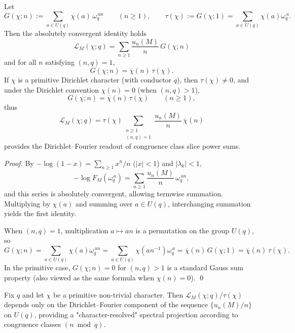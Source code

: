 \begin{theorem}\label{thm:finite-part-dirichlet-torsion-gauss-expansion}
Let
\[
G(\chi;n):=\sum_{a\in U(q)}\chi(a)\,\omega_q^{\,an}\qquad(n\ge1),
\qquad
\tau(\chi):=G(\chi;1)=\sum_{a\in U(q)}\chi(a)\omega_q^{\,a}.
\]
Then the absolutely convergent identity holds
\[
\boxed{\;
\mathcal{L}_M(\chi;q)=\sum_{n\ge1}\frac{u_n(M)}{n}\,G(\chi;n)\;}
\]
and for all \(n\) satisfying \((n,q)=1\),
\[
G(\chi;n)=\overline{\chi}(n)\,\tau(\chi).
\]
If \(\chi\) is a primitive Dirichlet character (with conductor \(q\)), then \(\tau(\chi)\neq0\), and under the Dirichlet convention \(\chi(n)=0\) (when \((n,q)>1\)),
\[
G(\chi;n)=\overline{\chi}(n)\,\tau(\chi)\qquad(n\ge1),
\]
thus
\[
\boxed{\;
\mathcal{L}_M(\chi;q)
=\tau(\chi)\sum_{\substack{n\ge1\\(n,q)=1}}\frac{u_n(M)}{n}\,\overline{\chi}(n)\;}
\]
provides the Dirichlet--Fourier readout of congruence class slice power sums.
\end{theorem}
\begin{proof}
By \(-\log(1-x)=\sum_{n\ge1}x^n/n\) (\(|x|<1\)) and \(|\lambda_k|<1\),
\[
-\log F_M(\omega_q^{\,a})
=\sum_{n\ge1}\frac{u_n(M)}{n}\,\omega_q^{\,an},
\]
and this series is absolutely convergent, allowing termwise summation.
Multiplying by \(\chi(a)\) and summing over \(a\in U(q)\), interchanging summation yields the first identity.
\par
When \((n,q)=1\), multiplication \(a\mapsto an\) is a permutation on the group \(U(q)\), so
\[
G(\chi;n)=\sum_{a\in U(q)}\chi(a)\omega_q^{\,an}
=\sum_{a\in U(q)}\chi(an^{-1})\omega_q^{\,a}
=\overline{\chi}(n)\,G(\chi;1)
=\overline{\chi}(n)\,\tau(\chi).
\]
In the primitive case, \(G(\chi;n)=0\) for \((n,q)>1\) is a standard Gauss sum property (also viewed as the same formula when \(\chi(n)=0\)). \qed
\end{proof}

\begin{corollary}\label{cor:finite-part-dirichlet-character-projection}
Fix \(q\) and let \(\chi\) be a primitive non-trivial character.
Then \(\mathcal{L}_M(\chi;q)/\tau(\chi)\) depends only on the Dirichlet--Fourier component of the sequence \(\{u_n(M)/n\}\) on \(U(q)\),
providing a "character-resolved" spectral projection according to congruence classes \((n\bmod q)\).
\end{corollary}

